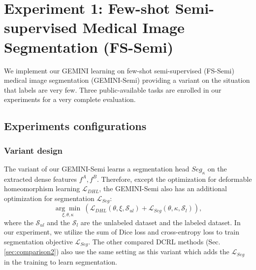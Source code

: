 \section{Experiment 1: Few-shot Semi-supervised Medical Image Segmentation (FS-Semi)}
\label{sec:task2}
We implement our GEMINI learning on few-shot semi-supervised (FS-Semi) medical image segmentation (GEMINI-Semi) providing a variant on the situation that labels are very few. Three public-available tasks are enrolled in our experiments for a very complete evaluation.
\subsection{Experiments configurations}
\label{sec:configurations2}
\subsubsection{Variant design} The variant of our GEMINI-Semi learns a segmentation head $Seg_{\kappa}$ on the extracted dense features $f^{A},f^{B}$. Therefore, except the optimization for deformable homeomorphism learning $\mathcal{L}_{DHL}$, the GEMINI-Semi also has an additional optimization for segmentation $\mathcal{L}_{Seg}$:
\begin{equation}\label{equ:variant2}
\underset{\xi,\theta,\kappa}{\arg\min}\ (\mathcal{L}_{DHL}(\theta,\xi,\mathcal{S}_{ul})+\mathcal{L}_{Seg}(\theta,\kappa,\mathcal{S}_{l})),
\end{equation}
where the $\mathcal{S}_{ul}$ and the $\mathcal{S}_{l}$ are the unlabeled dataset and the labeled dataset. In our experiment, we utilize the sum of Dice loss and cross-entropy loss \cite{ma2021loss} to train segmentation objective $\mathcal{L}_{Seg}$. The other compared DCRL methods (Sec.\ref{sec:comparison2}) also use the same setting as this variant which adds the $\mathcal{L}_{Seg}$ in the training to learn segmentation.
